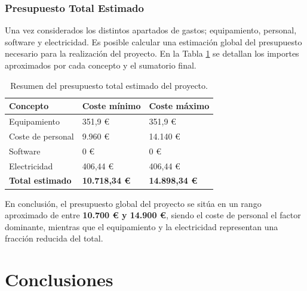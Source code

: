 \documentclass{report}
\begin{document}
\subsection{Presupuesto Total Estimado}

Una vez considerados los distintos apartados de gastos; equipamiento, personal, software y electricidad. Es posible calcular una estimación global del presupuesto necesario para la realización del proyecto. 
En la Tabla \ref{tab:coste-total} se detallan los importes aproximados por cada concepto y el sumatorio final.

\begin{table}[H]
\centering
\begin{tabular}{|p{5cm}|p{3cm}|p{3cm}|}
\hline
\textbf{Concepto} & \textbf{Coste mínimo} & \textbf{Coste máximo} \\
\hline
Equipamiento & 351,9 € & 351,9 € \\
\hline
Coste de personal & 9.960 € & 14.140 € \\
\hline
Software & 0 € & 0 € \\
\hline
Electricidad & 406,44 € & 406,44 € \\
\hline
\textbf{Total estimado} & \textbf{10.718,34 €} & \textbf{14.898,34 €} \\
\hline
\end{tabular}
\caption{Resumen del presupuesto total estimado del proyecto.}
\label{tab:coste-total}
\end{table}


En conclusión, el presupuesto global del proyecto se sitúa en un rango aproximado de entre \textbf{10.700 € y 14.900 €}, siendo el coste de personal el factor dominante, mientras que el equipamiento y la electricidad representan una fracción reducida del total.


\chapter{Conclusiones}
\label{chap:conclusiones}
\end{document}
